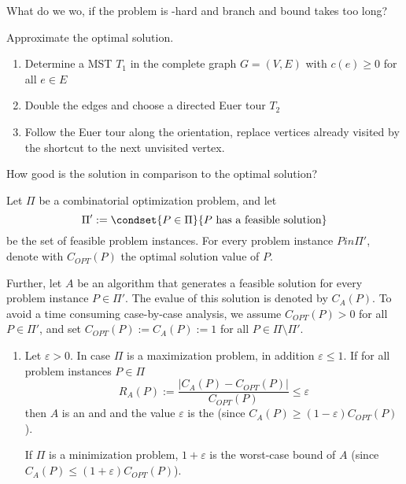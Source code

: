 \begin{lec}[2012-01-23]\end{lec}
\begin{qstn}What do we wo, if the problem is \npoly-hard and branch and bound takes too long?\end{qstn}
Approximate the optimal solution.

\begin{enumerate}
	\item Determine a MST $T_1$ in the complete graph $G=(V,E)$ with $c(e) \geq 0$ for all $e \in E$
	\item Double the edges and choose a directed Euer tour $T_2$
	\item Follow the Euer tour along the orientation, replace vertices already visited by the shortcut to the next unvisited vertex.
\end{enumerate}
\begin{qstn}
	How good is the solution in comparison to the optimal solution?
\end{qstn}
\begin{defn}
	Let $\Pi$ be a combinatorial optimization problem, and let \[
		\Pi':=\condset{P \in \Pi}{P \text{ has a feasible solution}}
	\]
	be the set of feasible problem instances. For every problem instance $P in \Pi'$, denote with $C_{OPT}(P)$ the optimal solution value of $P$.
  
  Further, let $A$ be an algorithm that generates a feasible solution for every problem instance $P \in \Pi'$. The evalue of this solution is denoted by $C_A(P)$. To avoid a time consuming case-by-case analysis, we assume $C_{OPT}(P)>0$ for all $P\in \Pi'$, and set $C_{OPT}(P):=C_A(P):=1$ for all $P \in \Pi \setminus \Pi'$.
  
  \begin{enumerate}
    \item Let $\varepsilon >0$. In case $\Pi$ is a maximization problem, in addition $\varepsilon \leq 1$. If for all problem instances $P \in \Pi$ \[
      R_A(P):= \frac{|C_A(P)-C_{OPT}(P)|}{C_{OPT}(P)} \leq \varepsilon
    \] then $A$ is an  and and the value $\varepsilon$ is the  (since $C_A(P) \geq (1-\varepsilon)C_{OPT}(P)$).
    
    If $\Pi$ is a minimization problem, $1 +  \varepsilon$ is the worst-case bound of $A$ (since $C_A(P) \leq (1+\varepsilon)C_{OPT}(P)$).
  \end{enumerate}
\end{defn}

